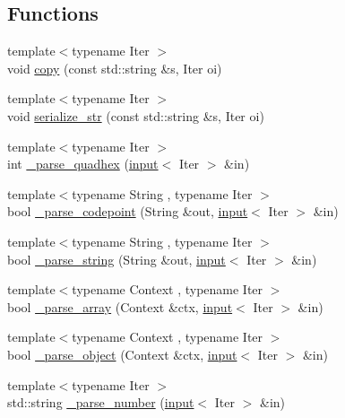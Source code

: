 \subsection*{Functions}
\begin{DoxyCompactItemize}
\item 
{\footnotesize template$<$typename Iter $>$ }\\void \hyperlink{namespacepicojson_abc2111aa71797805957a4296fdf9c66d}{copy} (const std\+::string \&s, Iter oi)
\item 
{\footnotesize template$<$typename Iter $>$ }\\void \hyperlink{namespacepicojson_a11130e017d868857aeb016f5e3d29008}{serialize\+\_\+str} (const std\+::string \&s, Iter oi)
\item 
{\footnotesize template$<$typename Iter $>$ }\\int \hyperlink{namespacepicojson_a92d4f60542bbdfe8203f10e1fcce9368}{\+\_\+parse\+\_\+quadhex} (\hyperlink{classpicojson_1_1input}{input}$<$ Iter $>$ \&in)
\item 
{\footnotesize template$<$typename String , typename Iter $>$ }\\bool \hyperlink{namespacepicojson_a05316c2614f3e7a4559ce1d1003eb051}{\+\_\+parse\+\_\+codepoint} (String \&out, \hyperlink{classpicojson_1_1input}{input}$<$ Iter $>$ \&in)
\item 
{\footnotesize template$<$typename String , typename Iter $>$ }\\bool \hyperlink{namespacepicojson_a9a1d94feb2718129796225d77c9e8d11}{\+\_\+parse\+\_\+string} (String \&out, \hyperlink{classpicojson_1_1input}{input}$<$ Iter $>$ \&in)
\item 
{\footnotesize template$<$typename Context , typename Iter $>$ }\\bool \hyperlink{namespacepicojson_adcae039b132c6c96d2b2d9e786a04a88}{\+\_\+parse\+\_\+array} (Context \&ctx, \hyperlink{classpicojson_1_1input}{input}$<$ Iter $>$ \&in)
\item 
{\footnotesize template$<$typename Context , typename Iter $>$ }\\bool \hyperlink{namespacepicojson_a480ed5e3461568672197a42e259a44c9}{\+\_\+parse\+\_\+object} (Context \&ctx, \hyperlink{classpicojson_1_1input}{input}$<$ Iter $>$ \&in)
\item 
{\footnotesize template$<$typename Iter $>$ }\\std\+::string \hyperlink{namespacepicojson_a771defe1d981b7091c2156bf4720625c}{\+\_\+parse\+\_\+number} (\hyperlink{classpicojson_1_1input}{input}$<$ Iter $>$ \&in)

\end{DoxyCompactItemize}
